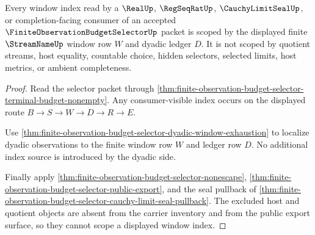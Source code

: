 \begin{theorem}
\label{thm:finite-observation-budget-selector-window-index-scope}
Every window index read by a $\RealUp$, $\RegSeqRatUp$, $\CauchyLimitSealUp$, or completion-facing consumer of an accepted $\FiniteObservationBudgetSelectorUp$ packet is scoped by the displayed finite $\StreamNameUp$ window row $W$ and dyadic ledger $D$. It is not scoped by quotient streams, host equality, countable choice, hidden selectors, selected limits, host metrics, or ambient completeness.
\end{theorem}
\begin{proof}
Read the selector packet through \autoref{thm:finite-observation-budget-selector-terminal-budget-nonempty}. Any consumer-visible index occurs on the displayed route $B \to S \to W \to D \to R \to E$.

Use \autoref{thm:finite-observation-budget-selector-dyadic-window-exhaustion} to localize dyadic observations to the finite window row $W$ and ledger row $D$. No additional index source is introduced by the dyadic side.

Finally apply \autoref{thm:finite-observation-budget-selector-nonescape}, \autoref{thm:finite-observation-budget-selector-public-export}, and the seal pullback of \autoref{thm:finite-observation-budget-selector-cauchy-limit-seal-pullback}. The excluded host and quotient objects are absent from the carrier inventory and from the public export surface, so they cannot scope a displayed window index.
\end{proof}

